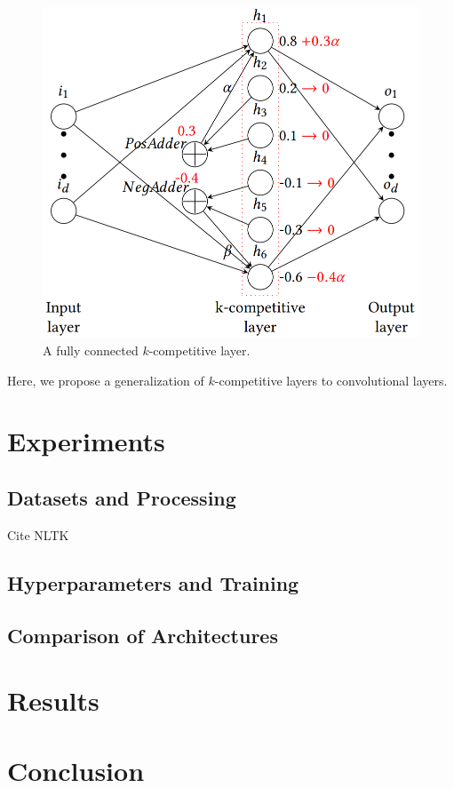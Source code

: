 \documentclass{vldb}
\begin{document}
\begin{figure}[h]
\centering
\includegraphics[width=.8\linewidth]{k_complayer.png}
\caption{\textmd{A fully connected $k$-competitive layer.}}
\end{figure}

Here, we propose a generalization of $k$-competitive layers to convolutional layers.

\section{Experiments}
\subsection{Datasets and Processing}
Cite NLTK

\subsection{Hyperparameters and Training}

\subsection{Comparison of Architectures}

\section{Results}

\section{Conclusion}
\end{document}
